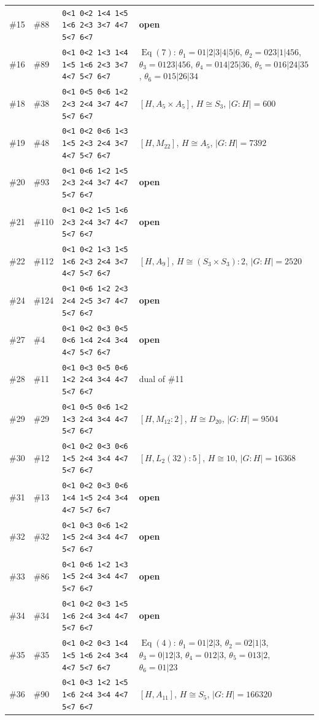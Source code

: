 \documentclass[11pt]{article}
\theoremstyle{remark}
\newcommand{\Eq}{\operatorname{Eq}}
\begin{document}
{\begin{longtable}{@{}l l p{4.9cm} p{7.4cm}@{}}
\#15 & \#88 & \texttt{0<1 0<2 1<4 1<5 1<6 2<3 3<7 4<7 5<7 6<7} & \textbf{open}\\
\#16 & \#89 & \texttt{0<1 0<2 1<3 1<4 1<5 1<6 2<3 3<7 4<7 5<7 6<7} & $\Eq(7)$: $\theta_1=01|2|3|4|5|6$, $\theta_2=023|1|456$, $\theta_3=0123|456$, $\theta_4=014|25|36$, $\theta_5=016|24|35$, $\theta_6=015|26|34$\\
\#18 & \#38 & \texttt{0<1 0<5 0<6 1<2 2<3 2<4 3<7 4<7 5<7 6<7} & $[H,A_5\times A_5]$, $H\cong S_{3}$, $|G:H|=600$\\
\#19 & \#48 & \texttt{0<1 0<2 0<6 1<3 1<5 2<3 2<4 3<7 4<7 5<7 6<7} & $[H,M_{22}]$, $H\cong A_{5}$, $|G:H|=7392$\\
\#20 & \#93 & \texttt{0<1 0<6 1<2 1<5 2<3 2<4 3<7 4<7 5<7 6<7} & \textbf{open}\\
\#21 & \#110 & \texttt{0<1 0<2 1<5 1<6 2<3 2<4 3<7 4<7 5<7 6<7} & \textbf{open}\\
\#22 & \#112 & \texttt{0<1 0<2 1<3 1<5 1<6 2<3 2<4 3<7 4<7 5<7 6<7} & $[H,A_9]$, $H\cong (S_{3}\times S_{3}){:}2$, $|G:H|=2520$\\
\#24 & \#124 & \texttt{0<1 0<6 1<2 2<3 2<4 2<5 3<7 4<7 5<7 6<7} & \textbf{open}\\
\#27 & \#4 & \texttt{0<1 0<2 0<3 0<5 0<6 1<4 2<4 3<4 4<7 5<7 6<7} & \textbf{open}\\
\#28 & \#11 & \texttt{0<1 0<3 0<5 0<6 1<2 2<4 3<4 4<7 5<7 6<7} & dual of \#11\\
\#29 & \#29 & \texttt{0<1 0<5 0<6 1<2 1<3 2<4 3<4 4<7 5<7 6<7} & $[H,M_{12}{:}2]$, $H\cong D_{20}$, $|G:H|=9504$\\
\#30 & \#12 & \texttt{0<1 0<2 0<3 0<6 1<5 2<4 3<4 4<7 5<7 6<7} & $[H,L_2(32){:}5]$, $H\cong 10$, $|G:H|=16368$\\
\#31 & \#13 & \texttt{0<1 0<2 0<3 0<6 1<4 1<5 2<4 3<4 4<7 5<7 6<7} & \textbf{open}\\
\#32 & \#32 & \texttt{0<1 0<3 0<6 1<2 1<5 2<4 3<4 4<7 5<7 6<7} & \textbf{open}\\
\#33 & \#86 & \texttt{0<1 0<6 1<2 1<3 1<5 2<4 3<4 4<7 5<7 6<7} & \textbf{open}\\
\#34 & \#34 & \texttt{0<1 0<2 0<3 1<5 1<6 2<4 3<4 4<7 5<7 6<7} & \textbf{open}\\
\#35 & \#35 & \texttt{0<1 0<2 0<3 1<4 1<5 1<6 2<4 3<4 4<7 5<7 6<7} & $\Eq(4)$: $\theta_1=01|2|3$, $\theta_2=02|1|3$, $\theta_3=0|12|3$, $\theta_4=012|3$, $\theta_5=013|2$, $\theta_6=01|23$\\
\#36 & \#90 & \texttt{0<1 0<3 1<2 1<5 1<6 2<4 3<4 4<7 5<7 6<7} & $[H,A_{11}]$, $H\cong S_{5}$, $|G:H|=166320$\\

\end{longtable}}
\end{document}

